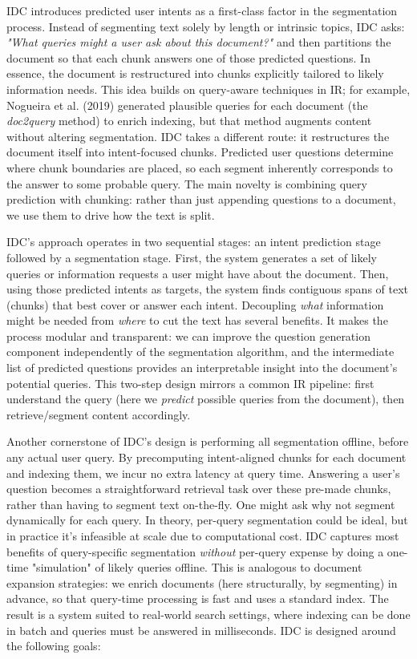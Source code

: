 \documentclass[12pt,a4paper]{report}
\begin{document}
IDC introduces predicted user intents as a first-class factor in the segmentation process. Instead of segmenting text solely by length or intrinsic topics, IDC asks: \textit{"What queries might a user ask about this document?"} and then partitions the document so that each chunk answers one of those predicted questions. In essence, the document is restructured into chunks explicitly tailored to likely information needs. This idea builds on query-aware techniques in IR; for example, Nogueira et al. (2019) generated plausible queries for each document (the \textit{doc2query} method) to enrich indexing, but that method augments content without altering segmentation. IDC takes a different route: it restructures the document itself into intent-focused chunks. Predicted user questions determine where chunk boundaries are placed, so each segment inherently corresponds to the answer to some probable query. The main novelty is combining query prediction with chunking: rather than just appending questions to a document, we use them to drive how the text is split.

IDC's approach operates in two sequential stages: an intent prediction stage followed by a segmentation stage. First, the system generates a set of likely queries or information requests a user might have about the document. Then, using those predicted intents as targets, the system finds contiguous spans of text (chunks) that best cover or answer each intent. Decoupling \textit{what} information might be needed from \textit{where} to cut the text has several benefits. It makes the process modular and transparent: we can improve the question generation component independently of the segmentation algorithm, and the intermediate list of predicted questions provides an interpretable insight into the document's potential queries. This two-step design mirrors a common IR pipeline: first understand the query (here we \textit{predict} possible queries from the document), then retrieve/segment content accordingly.

Another cornerstone of IDC's design is performing all segmentation offline, before any actual user query. By precomputing intent-aligned chunks for each document and indexing them, we incur no extra latency at query time. Answering a user's question becomes a straightforward retrieval task over these pre-made chunks, rather than having to segment text on-the-fly. One might ask why not segment dynamically for each query. In theory, per-query segmentation could be ideal, but in practice it's infeasible at scale due to computational cost. IDC captures most benefits of query-specific segmentation \textit{without} per-query expense by doing a one-time "simulation" of likely queries offline. This is analogous to document expansion strategies: we enrich documents (here structurally, by segmenting) in advance, so that query-time processing is fast and uses a standard index. The result is a system suited to real-world search settings, where indexing can be done in batch and queries must be answered in milliseconds.
IDC is designed around the following goals:
\end{document}
